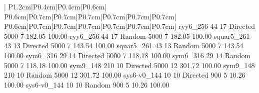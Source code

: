\documentclass[conference]{IEEEtran}
\begin{document}
\begin{table}[!t]
\begin{tabular}{|
P{1.2cm}|P{0.4cm}|P{0.4cm}|P{0.6cm}|
P{0.6cm}|P{0.7cm}|P{0.7cm}|P{0.7cm}|P{0.7cm}|P{0.7cm}|P{0.7cm}|
P{0.6cm}|P{0.7cm}|P{0.7cm}|P{0.7cm}|P{0.7cm}|P{0.7cm}|P{0.7cm}|
}
ryy6_256	44	17	Directed	5000	7	182.05	100.00%
ryy6_256	44	17	Random	5000	7	182.05	100.00%
squar5_261	43	13	Directed	5000	7	143.54	100.00%
squar5_261	43	13	Random	5000	7	143.54	100.00%
sym6_316	29	14	Directed	5000	7	118.18	100.00%
sym6_316	29	14	Random	5000	7	118.18	100.00%
sym9_148	210	10	Directed	5000	12	301.72	100.00%
sym9_148	210	10	Random	5000	12	301.72	100.00%
sys6-v0_144	10	10	Directed	900	5	10.26	100.00%
sys6-v0_144	10	10	Random	900	5	10.26	100.00%

\end{tabular}
\end{table}
\end{document}
